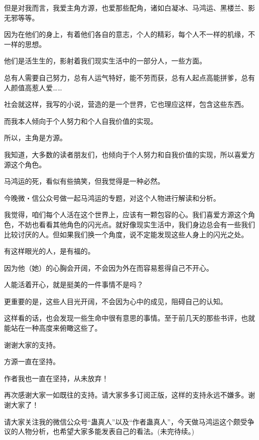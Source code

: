 \begin{this_body}
但是对我而言，我爱主角方源，也爱那些配角，诸如白凝冰、马鸿运、黑楼兰、影无邪等等。

因为在他们的身上，有着他们各自的意志，个人的精彩，每个人不一样的机缘，不一样的思想。

他们是活生生的，影射着我们现实生活中的一部分人，一些方面。

总有人需要自己努力，总有人运气特好，能不劳而获，总有人起点高能拼爹，总有人颜值高惹人爱……

社会就这样，我写的小说，营造的是一个世界，它也理应这样，包含这些东西。

而我本人倾向于个人努力和个人自我价值的实现。

所以，主角是方源。

我知道，大多数的读者朋友们，也倾向于个人努力和自我价值的实现，所以喜爱方源这个角色。

马鸿运的死，看似有些搞笑，但我觉得是一种必然。

今晚微・信公众号做一起马鸿运的专题，对这个人物进行解读和分析。

我觉得，咱们每个人活在这个世界上，应该有一颗包容的心。我们喜爱方源这个角色，不妨也看看其他角色的闪光点。就好像现实生活中，我们身边总会有一些我们比较讨厌的人。但如果我们换一个角度，说不定能发现这些人身上的闪光之处。

有这样眼光的人，是有福的。

因为他（她）的心胸会开阔，不会因为外在而容易惹得自己不开心。

人能活着开心，就是挺美的一件事情不是吗？

更重要的是，这些人目光开阔，不会因为心中的成见，阻碍自己的认知。

这样看的话，也会发现一些生命中很有意思的事情。至于前几天的那些书评，也就能站在一种高度来俯瞰这些了。

谢谢大家的支持。

方源一直在坚持。

作者我也一直在坚持，从未放弃！

再次感谢大家一如既往的支持。请大家多多订阅正版，这样的支持永远不嫌多。谢谢大家了！

请大家关注我的微信公众号“蛊真人”以及“作者蛊真人”，今天做马鸿运这个颇受争议的人物分析，也希望大家多能发表自己的看法。(未完待续。)

\end{this_body}

